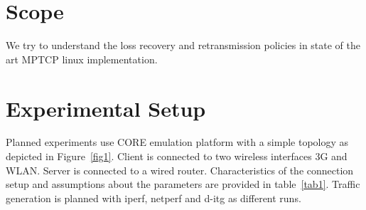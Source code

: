 \documentclass[12pt,draftcls,onecolumn]{IEEEtran}
\begin{document}
\section{Scope}\label{scope}

We try to understand the loss recovery and retransmission policies in state of the art MPTCP linux implementation.

\section{Experimental Setup}\label{exsetup}

Planned experiments use CORE emulation platform with a simple topology as depicted in Figure~\ref{fig1}.
Client is connected to two wireless interfaces 3G and WLAN. Server is connected to a wired router.
Characteristics of the connection setup and assumptions about the parameters are provided in table~\ref{tab1}.
Traffic generation is planned with iperf, netperf and d-itg as different runs. 
 
\end{document}
